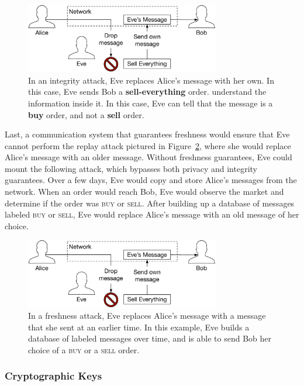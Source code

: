 \begin{figure}[hbt]
  \centering
  \includegraphics[width=85mm]{figures/integrity_attack.pdf}
  \caption{
    In an integrity attack, Eve replaces Alice's message with her own. In this
    case, Eve sends Bob a \textbf{sell-everything} order.
    understand the information inside it. In this case, Eve can tell that the
    message is a \textbf{buy} order, and not a \textbf{sell} order.
  }
  \label{fig:integrity_attack}
\end{figure}

Last, a communication system that guarantees freshness would ensure that Eve
cannot perform the replay attack pictured in Figure~\ref{fig:freshness_attack},
where she would replace Alice's message with an older message. Without
freshness guarantees, Eve could mount the following attack, which bypasses
both privacy and integrity guarantees. Over a few days, Eve would copy and
store Alice's messages from the network. When an order would reach Bob, Eve
would observe the market and determine if the order was \textsc{buy} or
\textsc{sell}. After building up a database of messages labeled \textsc{buy} or
\textsc{sell}, Eve would replace Alice's message with an old message of her
choice.

\begin{figure}[hbt]
  \centering
  \includegraphics[width=85mm]{figures/integrity_attack.pdf}
  \caption{
    In a freshness attack, Eve replaces Alice's message with a message that she
    sent at an earlier time. In this example, Eve builds a database of labeled
    messages over time, and is able to send Bob her choice of a \textsc{buy} or
    a \textsc{sell} order.
  }
  \label{fig:freshness_attack}
\end{figure}


\subsubsection{Cryptographic Keys}
\label{sec:crypto_keys}

